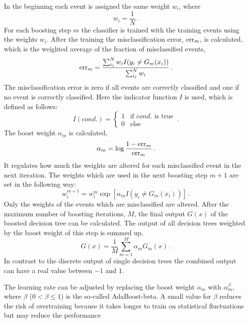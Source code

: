 In the beginning each event is assigned the same weight $w_i$, where
\begin{equation}
    w_i = \frac{1}{N} \,.
\end{equation}
For each boosting step $m$ the classifier is trained with the training events using the weights $w_i$.
After the training the misclassification error, $\operatorname{err}_m$, is calculated, which is the weighted average of the fraction of misclassified events,
\begin{equation}
    \operatorname{err}_m = \frac{\sum_{i_1}^N w_i I(y_i \neq G_m(x_i))}{\sum_{i_1}^N w_i} \,.
\end{equation}
The misclassification error is zero if all events are correctly classified and one if no event is correctly classified.
Here the indicator function $I$ is used, which is defined as follows:
\begin{equation}
    I(cond.) =
    \begin{cases}
        1 & \text{if $cond.$ is true} \\
        0 & \text{else}
    \end{cases} \,.
\end{equation}
The boost weight $\alpha_m$ is calculated,
\begin{equation}
    \alpha_m = \log \frac{1 - \operatorname{err}_m}{\operatorname{err}_m} \,.
\end{equation}
It regulates how much the weights are altered for each misclassified event in the next iteration.
The weights which are used in the next boosting step $m+1$ are set in the following way:
\begin{equation}
    w_i^{m+1} = w_i^{m} \exp \left[ \alpha_m I \left(y_i \neq G_m(x_i)\right) \right] \,.
\end{equation}
Only the weights of the events which are misclassified are altered.
After the maximum number of boosting iterations, $M$, the final output $G(x)$ of the boosted decision tree
can be calculated.
The output of all decision trees weighted by the boost weight of this step is summed up,
\begin{equation}
    \label{eq:bdts:output_ada}
    G(x) = \frac{1}{M} \sum_{m=1}^M  \alpha_m G_m(x) \,.
\end{equation}
In contrast to the discrete output of single decision trees the combined output can have a real value between $-1$ and $1$.

The learning rate can be adjusted by replacing the boost weight $\alpha_m$ with $\alpha_m^\beta$, where
$\beta$ ($0 < \beta \leq 1$) is the so-called AdaBoost-beta.
A small value for $\beta$ reduces the risk of overtraining because it takes longer to train on statistical fluctuations but may reduce the performance

